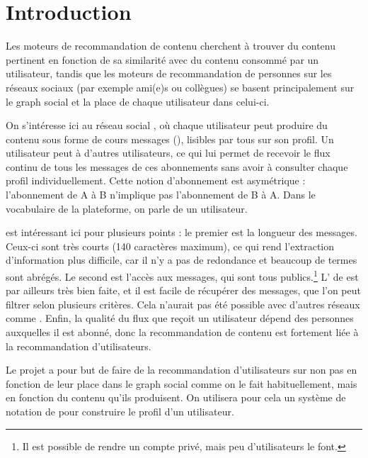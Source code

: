 
\section{Introduction}

Les moteurs de recommandation de contenu cherchent à trouver du contenu
pertinent en fonction de sa similarité avec du contenu consommé par un
utilisateur, tandis que les moteurs de recommandation de personnes sur les
réseaux sociaux (par exemple ami(e)s ou collègues) se basent principalement sur
le graph social et la place de chaque utilisateur dans celui-ci.

On s’intéresse ici au réseau social \twt{}, où chaque utilisateur peut produire
du contenu sous forme de cours messages (\tweets), lisibles par tous sur son
profil. Un utilisateur peut  à d’autres utilisateurs, ce qui lui
permet de recevoir le flux continu de tous les messages de ces abonnements sans
avoir à consulter chaque profil individuellement. Cette notion d’abonnement est
asymétrique : l’abonnement de A à B n’implique pas l’abonnement de B à A. Dans
le vocabulaire de la plateforme, on parle de  un utilisateur.

\twt{} est intéressant ici pour plusieurs points : le premier est la longueur
des messages. Ceux-ci sont très courts (140 caractères maximum), ce qui rend
l’extraction d’information plus difficile, car il n’y a pas de redondance et
beaucoup de termes sont abrégés. Le second est l’accès aux messages, qui sont
tous publics.\footnote{Il est possible de rendre un compte privé, mais peu
d’utilisateurs le font.} L’\api{} de \twt{} est par ailleurs très bien faite,
et il est facile de récupérer des messages, que l’on peut filtrer selon
plusieurs critères. Cela n’aurait pas été possible avec d’autres réseaux comme
\fb{}. Enfin, la qualité du flux que reçoit un utilisateur dépend des personnes
auxquelles il est abonné, donc la recommandation de contenu est fortement liée
à la recommandation d’utilisateurs.

Le projet \tb{} a pour but de faire de la recommandation d’utilisateurs sur
\twt{} non pas en fonction de leur place dans le graph social comme on le fait
habituellement, mais en fonction du contenu qu’ils produisent. On utilisera
pour cela un système de notation de \tweets{} pour construire le profil d’un
utilisateur.
